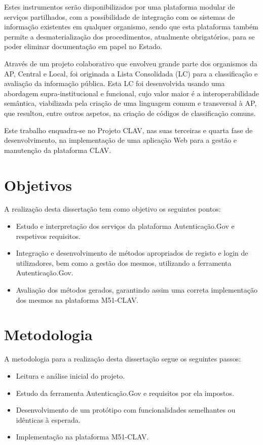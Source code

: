 Estes instrumentos serão disponibilizados por uma plataforma modular de serviços partilhados, com a possibilidade de integração com os sistemas de informação existentes em qualquer organismo, sendo que esta plataforma também permite a desmaterialização dos procedimentos, atualmente obrigatórios, para se poder eliminar documentação em papel no Estado.

Através de um projeto colaborativo que envolveu grande parte dos organismos da AP, Central e Local, foi originada a Lista Consolidada (LC) para a classificação e avaliação da informação pública. Esta LC foi desenvolvida usando uma abordagem supra-institucional e funcional, cujo valor maior é a interoperabilidade semântica, viabilizada pela criação de uma linguagem comum e transversal à AP, que resultou, entre outros aspetos, na criação de códigos de classificação comuns.

Este trabalho enquadra-se no Projeto CLAV, nas suas terceiras e quarta fase de desenvolvimento, na implementação de uma aplicação Web para a gestão e manutenção da plataforma CLAV. 


\cleardoublepage
\section{Objetivos}

A realização desta dissertação tem como objetivo os seguintes pontos:

\begin{itemize}
    \item Estudo e interpretação dos serviços da plataforma Autenticação.Gov e respetivos requisitos.
    \item Integração e desenvolvimento de métodos apropriados de registo e login de utilizadores, bem como a gestão dos mesmos, utilizando a ferramenta Autenticação.Gov.
    \item Avaliação dos métodos gerados, garantindo assim uma correta implementação dos mesmos na plataforma M51-CLAV.
\end{itemize}

\cleardoublepage
\section{Metodologia}

A metodologia para a realização desta dissertação segue os seguintes passos:

\begin{itemize}
    \item Leitura e análise inicial do projeto.
    \item Estudo da ferramenta Autenticação.Gov e requisitos por ela
impostos.
    \item Desenvolvimento de um protótipo com funcionalidades
semelhantes ou idênticas à esperada.
    \item Implementação na plataforma M51-CLAV.
\end{itemize}
